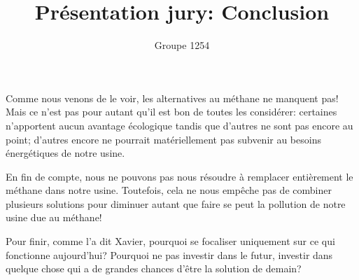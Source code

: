 \documentclass[12pt, a4paper]{article}
\title{Présentation jury: Conclusion}
\author{Groupe 1254}
\begin{document}
\maketitle
Comme nous venons de le voir, les alternatives au méthane ne manquent pas! Mais ce n'est pas pour autant qu'il est bon de toutes les considérer: certaines n'apportent aucun avantage écologique tandis que d'autres ne sont pas encore au point; d'autres encore ne pourrait matériellement pas subvenir au besoins énergétiques de notre usine.

En fin de compte, nous ne pouvons pas nous résoudre à remplacer entièrement le méthane dans notre usine. Toutefois, cela ne nous empêche pas de combiner plusieurs solutions pour diminuer autant que faire se peut la pollution de notre usine due au méthane! 

Pour finir, comme l'a dit Xavier, pourquoi se focaliser uniquement sur ce qui fonctionne aujourd'hui? Pourquoi ne pas investir dans le futur, investir dans quelque chose qui a de grandes chances d'être la solution de demain?
\end{document}
